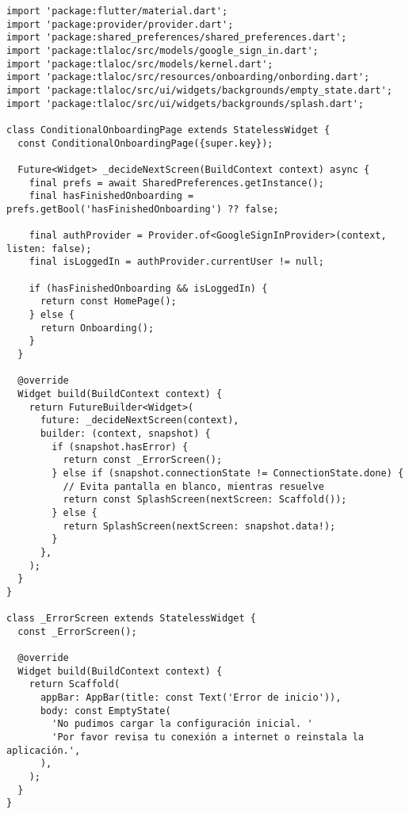 \begin{verbatim}
import 'package:flutter/material.dart';
import 'package:provider/provider.dart';
import 'package:shared_preferences/shared_preferences.dart';
import 'package:tlaloc/src/models/google_sign_in.dart';
import 'package:tlaloc/src/models/kernel.dart';
import 'package:tlaloc/src/resources/onboarding/onbording.dart'; 
import 'package:tlaloc/src/ui/widgets/backgrounds/empty_state.dart';
import 'package:tlaloc/src/ui/widgets/backgrounds/splash.dart'; 

class ConditionalOnboardingPage extends StatelessWidget {
  const ConditionalOnboardingPage({super.key});

  Future<Widget> _decideNextScreen(BuildContext context) async {
    final prefs = await SharedPreferences.getInstance();
    final hasFinishedOnboarding = prefs.getBool('hasFinishedOnboarding') ?? false;

    final authProvider = Provider.of<GoogleSignInProvider>(context, listen: false);
    final isLoggedIn = authProvider.currentUser != null;

    if (hasFinishedOnboarding && isLoggedIn) {
      return const HomePage();
    } else {
      return Onboarding();
    }
  }

  @override
  Widget build(BuildContext context) {
    return FutureBuilder<Widget>(
      future: _decideNextScreen(context),
      builder: (context, snapshot) {
        if (snapshot.hasError) {
          return const _ErrorScreen();
        } else if (snapshot.connectionState != ConnectionState.done) {
          // Evita pantalla en blanco, mientras resuelve
          return const SplashScreen(nextScreen: Scaffold());
        } else {
          return SplashScreen(nextScreen: snapshot.data!);
        }
      },
    );
  }
}

class _ErrorScreen extends StatelessWidget {
  const _ErrorScreen();

  @override
  Widget build(BuildContext context) {
    return Scaffold(
      appBar: AppBar(title: const Text('Error de inicio')),
      body: const EmptyState(
        'No pudimos cargar la configuración inicial. '
        'Por favor revisa tu conexión a internet o reinstala la aplicación.',
      ),
    );
  }
}
\end{verbatim}






\newpage
